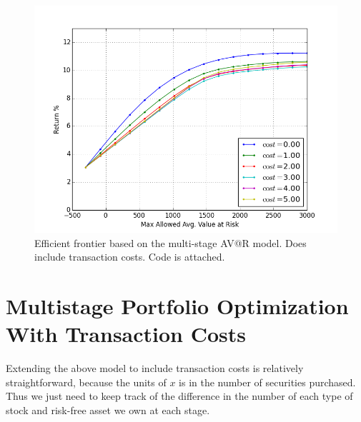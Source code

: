 \documentclass{amsart}
\theoremstyle{definition}
\theoremstyle{remark}
\begin{document}
\begin{figure}
\centering
\includegraphics[scale=0.5]{multi_stage_with_transaction_costs.png}
\caption{Efficient frontier based on the multi-stage AV@R model. Does include transaction costs.  Code is attached.}
\label{fig:multi_stage_with_transaction_costs}
\end{figure}

\section{Multistage Portfolio Optimization With Transaction Costs}
Extending the above model to include transaction costs is relatively straightforward, because the units of $x$ is in the number of securities purchased. Thus we just need to keep track of the difference in the number of each type of stock and risk-free asset we own at each stage.
\end{document}
